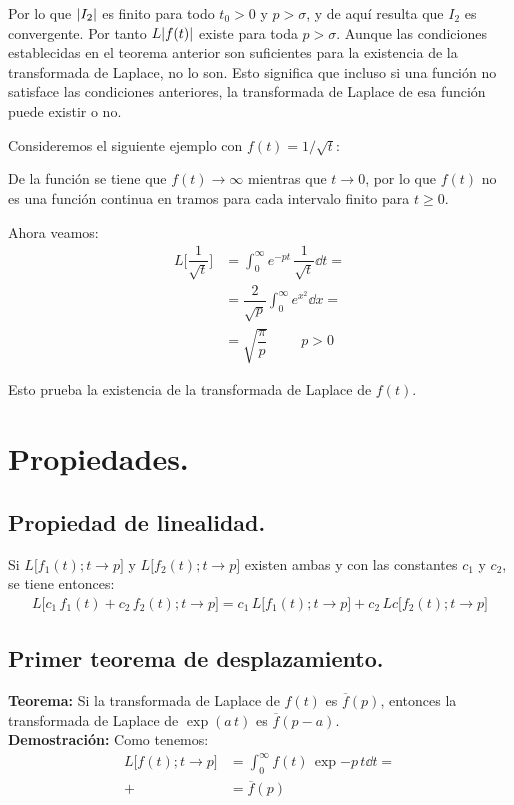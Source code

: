Por lo que $\abs{I_{2}}$ es finito para todo $t_{0} > 0$ y $p > \sigma$, y de aquí resulta que $I_{2}$ es convergente. Por tanto $L\abs{f(t)}$ existe para toda $p > \sigma$.
Aunque las condiciones establecidas en el teorema anterior son suficientes para la existencia de la transformada de Laplace, no lo son. Esto significa que incluso si una función no satisface las condiciones anteriores, la transformada de Laplace de esa función puede existir o no. 
\par
Consideremos el siguiente ejemplo con $f(t) = 1 / \sqrt{t}$:
\par
De la función se tiene que $f(t) \to \infty$ mientras que $t \to 0$, por lo que $f(t)$ no es una función continua en tramos para cada intervalo finito para $t \geq 0$.
\par
Ahora veamos:
\begin{align*}
L \big[\dfrac{1}{\sqrt{t}}\big] &= \int_{0}^{\infty} e^{-p t} \, \dfrac{1}{\sqrt{t}} \dd{t} = \\[0.5em]
&= \dfrac{2}{\sqrt{p}} \int_{0}^{\infty} e^{x^{2}} \dd{x} = \\[0.5em]
&= \sqrt{\dfrac{\pi}{p}} \hspace{1cm} p > 0
\end{align*}

Esto prueba la existencia de la transformada de Laplace de $f(t)$.

\section{Propiedades.}

\subsection{Propiedad de linealidad.}

Si $L \big[f_{1}(t); t \to p\big]$ y $L \big[f_{2}(t); t \to p\big]$ existen ambas y con las constantes $c_{1}$ y $c_{2}$, se tiene entonces:
\begin{align*}
L \big[c_{1} \, f_{1}(t) + c_{2} \, f_{2}(t) ; t \to p\big] = c_{1} \, L \big[f_{1}(t); t \to p\big] + c_{2} \, L c\big[f_{2}(t); t \to p\big]
\end{align*}

\subsection{Primer teorema de desplazamiento.}

\noindent \textbf{Teorema: } Si la transformada de Laplace de $f(t)$ es $\overline{f}(p)$, entonces la transformada de Laplace de $\exp(a \, t)$ es $\overline{f}(p - a)$.
\\[0.5em]
\textbf{Demostración: } Como tenemos:
\begin{align*}
L \big[f(t); t \to p\big] &= \int_{0}^{\infty} f(t) \, \exp{-p \, t} \dd{t} = \\[0.5em]+
&= \overline{f} (p)
\end{align*}


